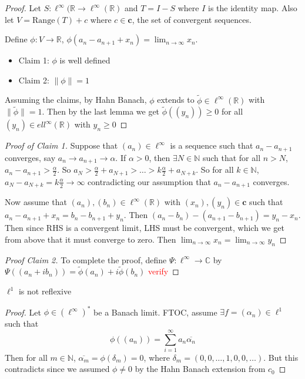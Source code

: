 \begin{proof}
  Let $S: \ell^\infty(\mathbb{R} \to \ell^\infty(\mathbb{R})$ and $T
    = I - S$ where $I$ is the identity map. Also let $V =
    \textrm{Range}(T) + c$ where $ c \in \textbf{c}$, the set of
    convergent sequences.

    Define $\phi: V \to \mathbb{R}$, $\phi(a_n - a_{n+1} + x_n) =
    \lim_{n \to \infty}  x_n$.
    \begin{itemize}[]
      \item Claim 1: $\phi$ is well defined
      \item Claim 2: $\|\phi\| = 1$
    \end{itemize}

    Assuming the claims, by Hahn Banach, $\phi$ extends to $\tilde{
    \phi} \in \ell^\infty(\mathbb{R})$ with $\|\tilde{\phi}\|= 1$.
    Then by the last lemma we get $ \tilde{\phi}((y_n)) \ge 0$ for
    all $(y_n) \in ell^\infty(\mathbb{R})$ with $y_n \ge 0$
  \end{proof}
  \begin{proof}[Proof of Claim 1]
    Suppose that $(a_n) \in \ell^\infty$ is a sequence such that
    $a_{n} - a_{n+1}$ converges, say $a_n \to a_{n+1} \to \alpha$. If
    $ \alpha > 0$, then $\exists N \in \mathbb{N}$ such that for all
    $n > N$, $ a_n - a_{n+1} > \frac{\alpha}{2}$. So $a_N >
    \frac{\alpha}{2} + a_{N+1} > \ldots > k\frac{\alpha}{2} +
    a_{N+k}$. So for all $k \in \mathbb{N}$, $a_N - a_{N+k} = k
    \frac{\alpha}{2} \to \infty$ contradicting our assumption that
    $a_n - a_{n+1}$ converges.

    Now assume that $(a_n), ( b_n) \in \ell^\infty(\mathbb{R})$ with
    $(x_n), (y_n) \in \textbf{c}$ such that $a_n - a_{n+1} + x_n =
    b_n - b_{n+1} + y_n$. Then $(a_n - b_n) - (a_{ n+1} - b_{n+1}) =
    y_n -x_n$. Then since  RHS is a convergent limit, LHS must be
    convergent, which we get from above that it must converge to
    zero. Then $\lim_{n \to \infty} x_n = \lim_{n \to \infty} y_n$
  \end{proof}
  \begin{proof}[Proof Claim 2]
    To complete the proof, define $ \Psi: \ell^\infty \to \mathbb{C}$
    by $\Psi((a_n + ib_n)) = \tilde{\phi}(a_n) + i \tilde{ \phi}(b_n)$
    \textcolor{red}{verify}
  \end{proof}

  \begin{corollary}
    $\ell^1$ is not reflexive
  \end{corollary}
  \begin{proof}
    Let $\phi \in (\ell^\infty)^{*}$ be a Banach limit. FTOC, assume
    $\exists f = (\alpha_n) \in \ell^1$ such that  \[
      \phi((a_n)) = \sum_{i = 1}^{\infty}  a_n  \overline{\alpha_n}
    \]
    Then for all $m \in \mathbb{N}$, $\overline{\alpha_m} =
    \phi(\delta_m) = 0$, where $\delta_m = (0, 0, \ldots, 1, 0, 0,
    \ldots)$. But this contradicts since we assumed $\phi \neq 0$ by
    the Hahn Banach extension from $c_0$
  \end{proof}

